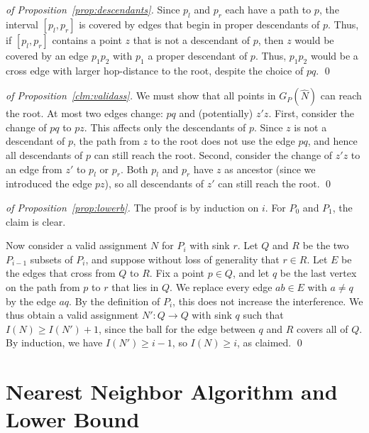 \documentclass[envcountsect,envcountsame,runningheads,a4paper]{llncs}
\begin{document}
\begin{proof}[of Proposition~\ref{prop:descendants}]
Since $p_l$ and $p_r$ each have a
path to $p$, the  interval $[p_l, p_r]$ is
covered by edges that begin in proper descendants of $p$.
Thus, if $[p_l, p_r]$ contains a point $z$ that is not a descendant
of $p$, then $z$ would be covered by an edge $p_1 p_2$ with
$p_1$ a proper descendant of $p$.
Thus, $p_1 p_2$ would be a cross edge with larger hop-distance to the
root, despite the choice of $pq$.
\qed{}
\end{proof}


\begin{proof}[of Proposition~\ref{clm:validass}]
We must show that all points in $G_P(\widehat{N})$ can reach the root.
At most two edges change: $pq$ and (potentially)
$z' z$.
First, consider the change of $pq$ to $pz$.
This affects only the descendants of $p$.
Since $z$ is not a descendant of $p$,
the path from $z$ to the root does not use the edge $pq$, and hence
all descendants of $p$ can still reach the root.
Second, consider the change of $z' z$ to an edge from $z'$ to
$p_l$ or $p_r$. Both $p_l$ and $p_r$ have $z$ as ancestor (since we
introduced the edge $pz$), so all descendants of $z'$
can still reach the root.
\qed{}
\end{proof}

\begin{proof}[of Proposition~\ref{prop:lowerb}]
The proof is by induction on $i$. For $P_0$ and $P_1$, the claim
is clear.


Now consider a valid assignment $N$ for $P_i$ with sink $r$. Let $Q$ and
$R$ be the two $P_{i-1}$ subsets of $P_i$, and suppose
without loss of generality that $r \in R$.
Let $E$ be the edges that cross from $Q$ to $R$.
Fix a point $p \in Q$, and let $q$ be the last vertex on the
path from $p$ to $r$ that lies in $Q$. We replace every
edge $ab \in E$ with $a \neq q$
by the edge $aq$. By the definition of $P_i$, this does not increase the interference.
We thus obtain a valid assignment
$N' : Q \rightarrow Q$ with sink $q$ such that
$I(N) \geq I(N') + 1$, since the ball for the edge
between $q$ and $R$ covers all of $Q$. By induction,
we have $I(N') \geq i-1$, so $I(N) \geq i$, as claimed.
\qed{}
\end{proof}

\section{Nearest Neighbor Algorithm and Lower Bound}\label{sec:nna}
\end{document}
